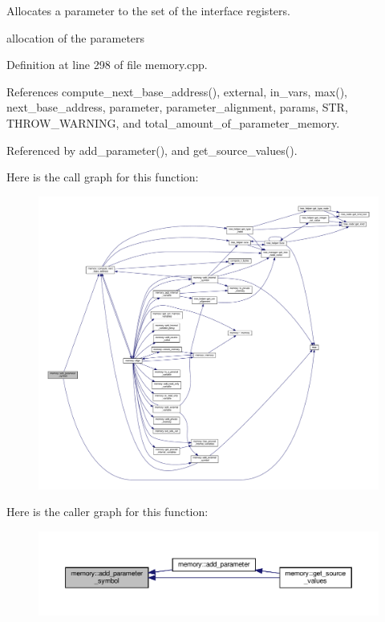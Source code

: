Allocates a parameter to the set of the interface registers. 

allocation of the parameters 

Definition at line 298 of file memory.\+cpp.



References compute\+\_\+next\+\_\+base\+\_\+address(), external, in\+\_\+vars, max(), next\+\_\+base\+\_\+address, parameter, parameter\+\_\+alignment, params, S\+TR, T\+H\+R\+O\+W\+\_\+\+W\+A\+R\+N\+I\+NG, and total\+\_\+amount\+\_\+of\+\_\+parameter\+\_\+memory.



Referenced by add\+\_\+parameter(), and get\+\_\+source\+\_\+values().

Here is the call graph for this function\+:
\nopagebreak
\begin{figure}[H]
\begin{center}
\leavevmode
\includegraphics[width=350pt]{d8/d99/classmemory_ae85e2b58d571e54800c0effee384a2b2_cgraph}
\end{center}
\end{figure}
Here is the caller graph for this function\+:
\nopagebreak
\begin{figure}[H]
\begin{center}
\leavevmode
\includegraphics[width=350pt]{d8/d99/classmemory_ae85e2b58d571e54800c0effee384a2b2_icgraph}
\end{center}
\end{figure}
\mbox{\label{classmemory_aa397acb159d30fa221af9cd66c442d7f}} 
